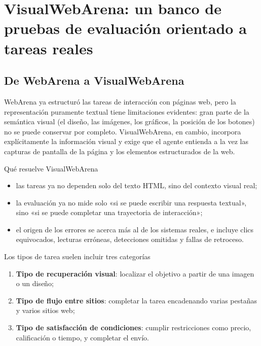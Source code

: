 \section{VisualWebArena: un banco de pruebas de evaluación orientado a tareas reales}

\subsection{De WebArena a VisualWebArena}
WebArena ya estructuró las tareas de interacción con páginas web, pero la representación puramente textual tiene limitaciones evidentes: gran parte de la semántica visual (el diseño, las imágenes, los gráficos, la posición de los botones) no se puede conservar por completo. VisualWebArena, en cambio, incorpora explícitamente la información visual y exige que el agente entienda a la vez las capturas de pantalla de la página y los elementos estructurados de la web.

\begin{importantbox}{Qué resuelve VisualWebArena}
\begin{itemize}
    \item las tareas ya no dependen solo del texto HTML, sino del contexto visual real;
    \item la evaluación ya no mide solo «si se puede escribir una respuesta textual», sino «si se puede completar una trayectoria de interacción»;
    \item el origen de los errores se acerca más al de los sistemas reales, e incluye clics equivocados, lecturas erróneas, detecciones omitidas y fallas de retroceso.
\end{itemize}
\end{importantbox}

\begin{knowledgebox}{Los tipos de tarea suelen incluir tres categorías}
\begin{enumerate}
    \item \textbf{Tipo de recuperación visual}: localizar el objetivo a partir de una imagen o un diseño;
    \item \textbf{Tipo de flujo entre sitios}: completar la tarea encadenando varias pestañas y varios sitios web;
    \item \textbf{Tipo de satisfacción de condiciones}: cumplir restricciones como precio, calificación o tiempo, y completar el envío.
\end{enumerate}
\end{knowledgebox}

